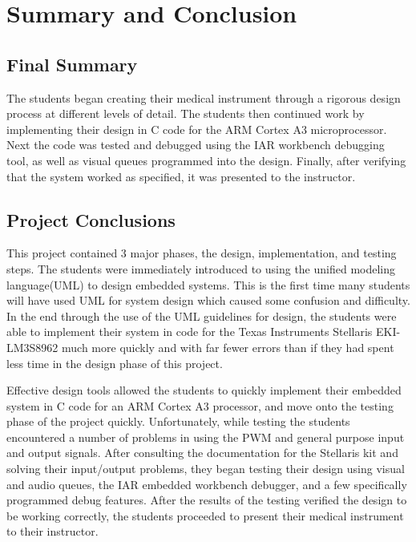 \documentclass[12pt]{article} %
\begin{document}
    \section{Summary and Conclusion}

    \subsection{Final Summary} The students began creating their medical instrument
    through a rigorous design process at different levels of detail. The students
    then continued work by implementing their design in C code for the ARM Cortex
    A3 microprocessor. Next the code was tested and debugged using the IAR
    workbench debugging tool, as well as visual queues programmed into the design.
    Finally, after verifying that the system worked as specified, it was presented
    to the instructor.

    \subsection{Project Conclusions} This project contained 3 major phases, the
    design, implementation, and testing steps. The students were immediately
    introduced to using the unified modeling language(UML) to design embedded
    systems. This is the first time many students will have used UML for system
    design which caused some confusion and difficulty. In the end through the use
    of the UML guidelines for design, the students were able to implement their
    system in code for the Texas Instruments Stellaris EKI-LM3S8962 much more
    quickly and with far fewer errors than if they had spent less time in the
    design phase of this project. 

    Effective design tools allowed the students to quickly implement their embedded
    system in C code for an ARM Cortex A3 processor, and move onto the testing
    phase of the project quickly. Unfortunately, while testing the students
    encountered a number of problems in using the PWM and general purpose input and
    output signals. After consulting the documentation for the Stellaris kit and
    solving their input/output problems, they began testing their design using
    visual and audio queues, the IAR embedded workbench debugger, and a few
    specifically programmed debug features. After the results of the testing
    verified the design to be working correctly, the students proceeded to present
    their medical instrument to their instructor.
\end{document}
